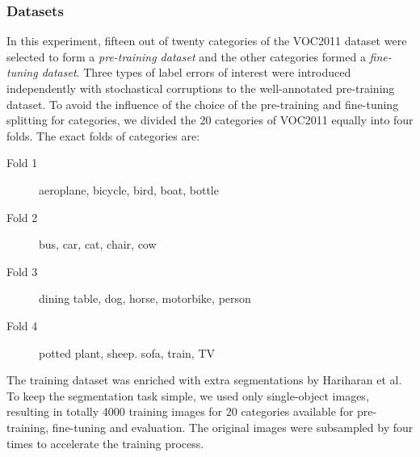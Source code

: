 \subsubsection{Datasets}
\label{subsubsec:noises}

In this experiment, fifteen out of twenty categories of the VOC2011 dataset were selected to form a \textit{pre-training dataset} and the other categories formed a \textit{fine-tuning dataset}.
Three types of label errors of interest were introduced independently with stochastical corruptions to the well-annotated pre-training dataset.
To avoid the influence of the choice of the pre-training and fine-tuning splitting for categories, we divided the 20 categories of VOC2011 equally into four folds.
The exact folds of categories are:
\begin{description}
  \item [Fold 1] aeroplane, bicycle, bird, boat, bottle
  \item [Fold 2] bus, car, cat, chair, cow
  \item [Fold 3] dining table, dog, horse, motorbike, person
  \item [Fold 4] potted plant, sheep. sofa, train, TV
\end{description}
The training dataset was enriched with extra segmentations by Hariharan et al. \cite{hariharan2011semantic}
To keep the segmentation task simple, we used only single-object images, resulting in totally 4000 training images for 20 categories available for pre-training, fine-tuning and evaluation.
The original images were subsampled by four times to accelerate the training process.



